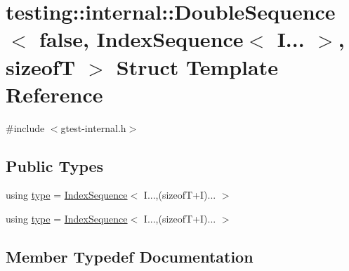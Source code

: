 \hypertarget{structtesting_1_1internal_1_1_double_sequence_3_01false_00_01_index_sequence_3_01_i_8_8_8_01_4_00_01sizeof_t_01_4}{}\section{testing\+::internal\+::Double\+Sequence$<$ false, Index\+Sequence$<$ I... $>$, sizeofT $>$ Struct Template Reference}
\label{structtesting_1_1internal_1_1_double_sequence_3_01false_00_01_index_sequence_3_01_i_8_8_8_01_4_00_01sizeof_t_01_4}


{\ttfamily \#include $<$gtest-\/internal.\+h$>$}

\subsection*{Public Types}
\begin{DoxyCompactItemize}
\item 
using \mbox{\hyperlink{structtesting_1_1internal_1_1_double_sequence_3_01false_00_01_index_sequence_3_01_i_8_8_8_01_4_00_01sizeof_t_01_4_af11568320fe19e984e2eb5ab9ad026aa}{type}} = \mbox{\hyperlink{structtesting_1_1internal_1_1_index_sequence}{Index\+Sequence}}$<$ I...,(sizeofT+I)... $>$
\item 
using \mbox{\hyperlink{structtesting_1_1internal_1_1_double_sequence_3_01false_00_01_index_sequence_3_01_i_8_8_8_01_4_00_01sizeof_t_01_4_af11568320fe19e984e2eb5ab9ad026aa}{type}} = \mbox{\hyperlink{structtesting_1_1internal_1_1_index_sequence}{Index\+Sequence}}$<$ I...,(sizeofT+I)... $>$
\end{DoxyCompactItemize}


\subsection{Member Typedef Documentation}
\mbox{\label{structtesting_1_1internal_1_1_double_sequence_3_01false_00_01_index_sequence_3_01_i_8_8_8_01_4_00_01sizeof_t_01_4_af11568320fe19e984e2eb5ab9ad026aa}} 
